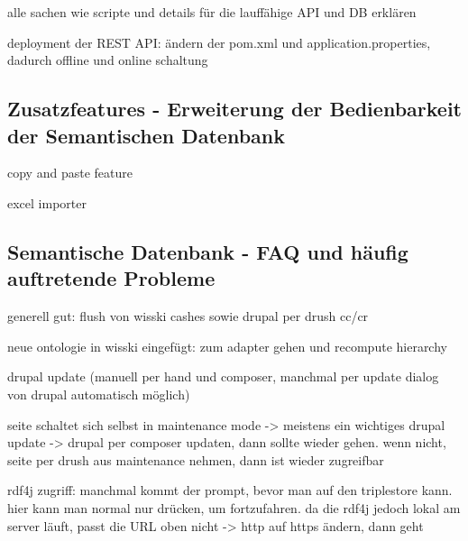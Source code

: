 alle sachen wie scripte und details für die lauffähige API und DB erklären 

deployment der REST API: ändern der pom.xml und application.properties, dadurch offline und online schaltung

\subsection{Zusatzfeatures - Erweiterung der Bedienbarkeit der Semantischen Datenbank}\label{sec:additional_features}

copy and paste feature

excel importer

\subsection{Semantische Datenbank - FAQ und häufig auftretende Probleme}\label{sec:faqSW}

generell gut: flush von wisski cashes sowie drupal per drush cc/cr

neue ontologie in wisski eingefügt: zum adapter gehen und recompute hierarchy

drupal update (manuell per hand und composer, manchmal per update dialog von drupal automatisch möglich)

seite schaltet sich selbst in maintenance mode -> meistens ein wichtiges drupal update -> drupal per composer updaten, dann sollte wieder gehen. wenn nicht, seite per drush aus maintenance nehmen, dann ist wieder zugreifbar

rdf4j zugriff: manchmal kommt der  prompt, bevor man auf den triplestore kann. hier kann man normal nur  drücken, um fortzufahren. da die rdf4j jedoch lokal am server läuft, passt die URL oben nicht -> http auf https ändern, dann geht









